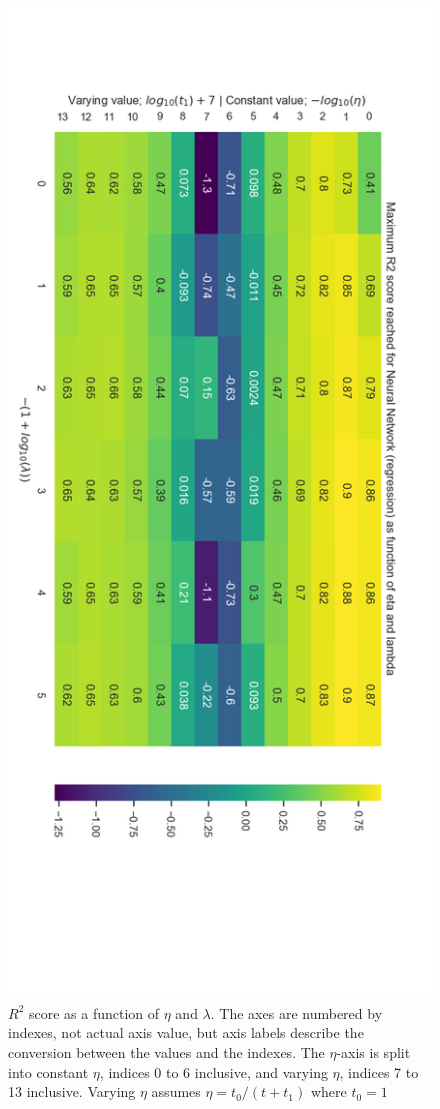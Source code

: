 \documentclass[a4paper, UKenglish]{article}
\newcommand{\0}{\mathbf{0}}
\newcommand{\1}{\mathbf{1}}
\begin{document}
\begin{figure}[H]
        \centering 
        \includegraphics[scale=0.6]{images/partB.png} 
        \caption{$R^2$ score as a function of $\eta$ and $\lambda$. The axes are numbered by indexes, not actual axis value, but axis labels describe the conversion between the values and the indexes. The $\eta$-axis is split into constant $\eta$, indices 0 to 6 inclusive, and varying $\eta$, indices 7 to 13 inclusive. Varying $\eta$ assumes $\eta = t_0/(t+t_1)$ where $t_0=1$}
        \label{fig:covers the page}
\end{figure}
\end{document}
